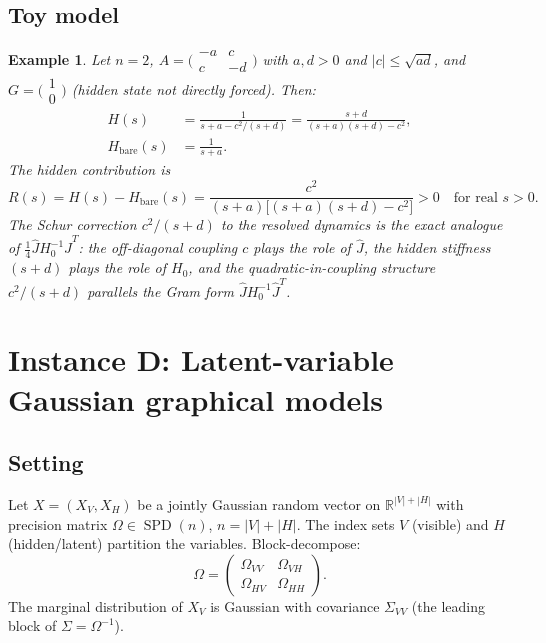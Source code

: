 \documentclass[11pt,a4paper]{article}
\numberwithin{equation}{section}
\DeclareMathOperator{\SPD}{SPD}
\newcommand{\R}{\mathbb{R}}
\theoremstyle{thmcompact}
\newtheorem{example}[theorem]{Example}
\theoremstyle{remark}
\begin{document}
\subsection{Toy model}

\begin{example}\label{ex:bridge-C-toy}
Let $n = 2$, $A = \bigl(\begin{smallmatrix} -a & c \\ c & -d \end{smallmatrix}\bigr)$ with $a, d > 0$ and $|c| \leq \sqrt{ad}$, and $G = \bigl(\begin{smallmatrix} 1 \\ 0 \end{smallmatrix}\bigr)$ (hidden state not directly forced). Then:
\begin{align*}
H(s) &= \frac{1}{s + a - c^2/(s+d)} = \frac{s+d}{(s+a)(s+d) - c^2}, \\
H_{\mathrm{bare}}(s) &= \frac{1}{s + a}.
\end{align*}
The hidden contribution is
\[
R(s) = H(s) - H_{\mathrm{bare}}(s) = \frac{c^2}{(s+a)\bigl[(s+a)(s+d) - c^2\bigr]} > 0 \quad \text{for real } s > 0.
\]
The Schur correction $c^2/(s+d)$ to the resolved dynamics is the exact analogue of $\tfrac{1}{4}\widehat{J}H_0^{-1}\widehat{J}^T$: the off-diagonal coupling $c$ plays the role of $\widehat{J}$, the hidden stiffness $(s+d)$ plays the role of $H_0$, and the quadratic-in-coupling structure $c^2/(s+d)$ parallels the Gram form $\widehat{J}H_0^{-1}\widehat{J}^T$.
\end{example}

\section{Instance D: Latent-variable Gaussian graphical models}
\label{sec:bridge-D}

\subsection{Setting}

Let $X = (X_V, X_H)$ be a jointly Gaussian random vector on $\R^{|V|+|H|}$ with precision matrix $\Omega \in \SPD(n)$, $n = |V|+|H|$. The index sets $V$ (visible) and $H$ (hidden/latent) partition the variables. Block-decompose:
\begin{equation}\label{eq:D-blocks}
\Omega = \begin{pmatrix} \Omega_{VV} & \Omega_{VH} \\ \Omega_{HV} & \Omega_{HH} \end{pmatrix}.
\end{equation}
The marginal distribution of $X_V$ is Gaussian with covariance $\Sigma_{VV}$ (the leading block of $\Sigma = \Omega^{-1}$).
\end{document}
